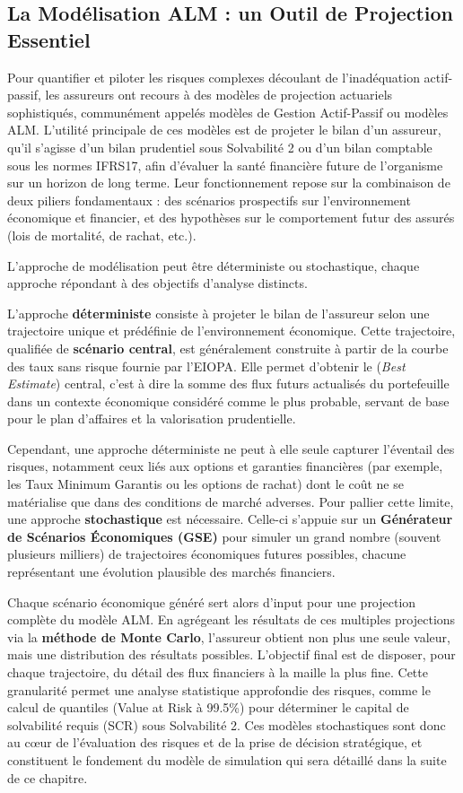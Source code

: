\subsection{La Modélisation ALM : un Outil de Projection Essentiel}

Pour quantifier et piloter les risques complexes découlant de l'inadéquation actif-passif, les assureurs ont recours à des modèles de projection actuariels sophistiqués, communément appelés modèles de Gestion Actif-Passif ou modèles ALM. L'utilité principale de ces modèles est de projeter le bilan d'un assureur, qu'il s'agisse d'un bilan prudentiel sous Solvabilité 2 ou d'un bilan comptable sous les normes IFRS17, afin d'évaluer la santé financière future de l'organisme sur un horizon de long terme. Leur fonctionnement repose sur la combinaison de deux piliers fondamentaux : des scénarios prospectifs sur l'environnement économique et financier, et des hypothèses sur le comportement futur des assurés (lois de mortalité, de rachat, etc.).

L'approche de modélisation peut être déterministe ou stochastique, chaque approche répondant à des objectifs d'analyse distincts.

L'approche \textbf{déterministe} consiste à projeter le bilan de l'assureur selon une trajectoire unique et prédéfinie de l'environnement économique. Cette trajectoire, qualifiée de \textbf{scénario central}, est généralement construite à partir de la courbe des taux sans risque fournie par l'EIOPA. Elle permet d'obtenir le (\textit{Best Estimate}) central, c'est à dire la somme des flux futurs actualisés du portefeuille dans un contexte économique considéré comme le plus probable, servant de base pour le plan d'affaires et la valorisation prudentielle.

Cependant, une approche déterministe ne peut à elle seule capturer l'éventail des risques, notamment ceux liés aux options et garanties financières (par exemple, les Taux Minimum Garantis ou les options de rachat) dont le coût ne se matérialise que dans des conditions de marché adverses. Pour pallier cette limite, une approche \textbf{stochastique} est nécessaire. Celle-ci s'appuie sur un \textbf{Générateur de Scénarios Économiques (GSE)} pour simuler un grand nombre (souvent plusieurs milliers) de trajectoires économiques futures possibles, chacune représentant une évolution plausible des marchés financiers.

Chaque scénario économique généré sert alors d'input pour une projection complète du modèle ALM. En agrégeant les résultats de ces multiples projections via la \textbf{méthode de Monte Carlo}, l'assureur obtient non plus une seule valeur, mais une distribution des résultats possibles. L'objectif final est de disposer, pour chaque trajectoire, du détail des flux financiers à la maille la plus fine. Cette granularité permet une analyse statistique approfondie des risques, comme le calcul de quantiles (Value at Risk à 99.5\%) pour déterminer le capital de solvabilité requis (SCR) sous Solvabilité 2. Ces modèles stochastiques sont donc au cœur de l'évaluation des risques et de la prise de décision stratégique, et constituent le fondement du modèle de simulation qui sera détaillé dans la suite de ce chapitre.



